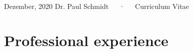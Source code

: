 \documentclass[11pt, a4paper]{awesome-cv}
\begin{document}
\makecvheader

\makecvfooter
  {Dezember, 2020}
    {Dr. Paul Schmidt~~~·~~~Curriculum Vitae}
  {\thepage}






\hypertarget{professional-experience}{%
\section{Professional experience}\label{professional-experience}}
\end{document}
